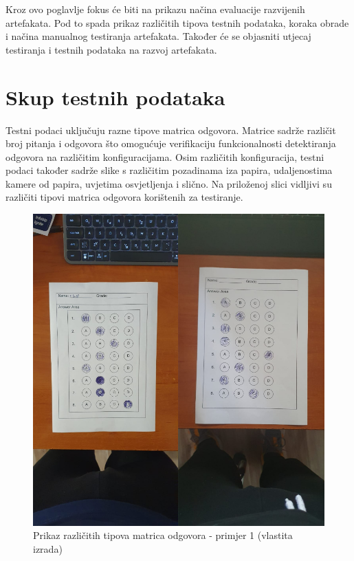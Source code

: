 \documentclass{foi}
\begin{document}
Kroz ovo poglavlje fokus će biti na prikazu načina evaluacije razvijenih artefakata. Pod to spada prikaz različitih tipova testnih podataka, koraka obrade i načina manualnog testiranja artefakata. Također će se objasniti utjecaj testiranja i testnih podataka na razvoj artefakata.

\section{Skup testnih podataka}

Testni podaci uključuju razne tipove matrica odgovora. Matrice sadrže različit broj pitanja i odgovora što omogućuje verifikaciju funkcionalnosti detektiranja odgovora na različitim konfiguracijama. Osim različitih konfiguracija, testni podaci također sadrže slike s različitim pozadinama iza papira, udaljenostima kamere od papira, uvjetima osvjetljenja i slično. Na priloženoj slici vidljivi su različiti tipovi matrica odgovora korištenih za testiranje.

\begin{figure}[H]
\centering
\includegraphics[width=0.8\linewidth]{slike/Test1.png}
\caption{Prikaz različitih tipova matrica odgovora - primjer 1 (vlastita izrada)}
\end{figure}
\end{document}
